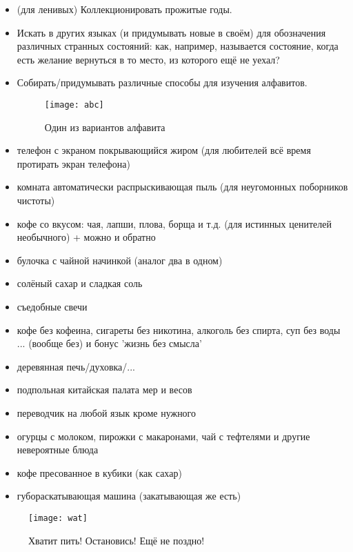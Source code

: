 \begin{itemize}
    \item (для ленивых) Коллекционировать прожитые годы.
    \item Искать в других языках (и придумывать новые в своём) для обозначения различных странных состояний: как, например, называется состояние, когда есть желание вернуться в то место, из которого ещё не уехал?
    \item Собирать/придумывать различные способы для изучения алфавитов.
    
    \begin{figure}[ht!]
        \centering
        \texttt{[image: abc]}
        \caption{Один из вариантов алфавита}
    \end{figure}
    
    \item телефон с экраном покрывающийся жиром (для любителей всё время протирать экран телефона)
    \item комната автоматически распрыскивающая пыль (для неугомонных поборников чистоты)
    \item кофе со вкусом: чая, лапши, плова, борща и т.д. (для истинных ценителей необычного) + можно и обратно
    \item булочка с чайной начинкой (аналог два в одном)
    \item солёный сахар и сладкая соль
    \item съедобные свечи
    \item кофе без кофеина, сигареты без никотина, алкоголь без спирта, суп без воды ... (вообще без) и бонус 'жизнь без смысла'
    \item деревянная печь/духовка/...
    \item подпольная китайская палата мер и весов
    \item переводчик на любой язык кроме нужного
    \item огурцы с молоком, пирожки с макаронами, чай с тефтелями и другие невероятные блюда
    \item кофе пресованное в кубики (как сахар)
    \item губораскатывающая машина (закатывающая же есть)
\end{itemize}
\begin{figure}[ht!]
    \centering
    \texttt{[image: wat]}
    \caption{Хватит пить! Остановись! Ещё не поздно!}
\end{figure}
